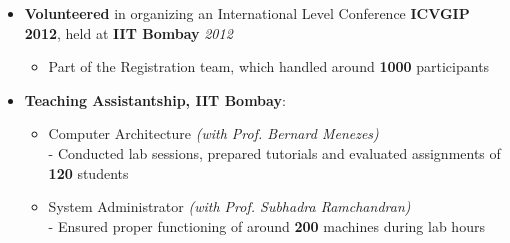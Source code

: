 \begin{itemize}
	\item \textbf{Volunteered} in organizing an International Level Conference \textbf{ICVGIP 2012}, held at \textbf{IIT Bombay} \hfill \emph{2012} \\[-0.6cm]
	\begin{itemize}
		\item Part of the Registration team, which handled around \textbf{1000} participants \\[-0.6cm]
	\end{itemize}
	\item \textbf{Teaching Assistantship, IIT Bombay}: \hfill \\[-0.6cm]
	\begin{itemize}
		\item Computer Architecture \hfill \emph{(with Prof. Bernard Menezes)} \\[0.05cm]
- Conducted lab sessions, prepared tutorials and evaluated assignments of \textbf{120} students \\[-0.5cm]
		\item System Administrator \hfill \emph{(with Prof. Subhadra Ramchandran)} \\[0.05cm]
- Ensured proper functioning of around \textbf{200} machines during lab hours \\[-0.4cm]
	\end{itemize}
\end{itemize}
